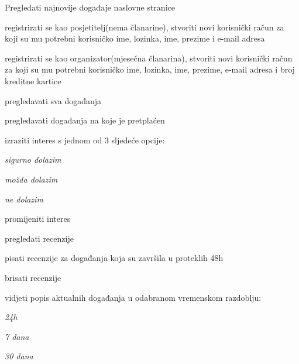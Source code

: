 		
		\begin{packed_enum}
			\item  {}
			
			\begin{packed_enum}
				
				\item Pregledati najnovije događaje naslovne stranice
				\item registrirati se kao posjetitelj(nema članarine),
				stvoriti novi korisnički račun za koji su mu potrebni korisničko ime, lozinka, ime, prezime i e-mail adresa
				\item registrirati se kao organizator(mjesečna članarina), stvoriti novi korisnički račun za koji su mu potrebni korisničko ime, lozinka, ime, prezime, e-mail adresa
				i broj kreditne kartice
				
				
			\end{packed_enum}
			
			\item  {}
			
			\begin{packed_enum}
				
				\item pregledavati sva događanja
				\item pregledavati događanja na koje je pretplaćen
				\item izraziti interes s jednom od 3 sljedeće opcije:
				
				\begin{packed_enum}
					\item \textit{sigurno dolazim}
					\item \textit{možda dolazim}
					\item \textit{ne dolazim}
				\end{packed_enum}	
				
				
				\item promijeniti interes 
				\item pregledati recenzije
				\item pisati recenzije za događanja koja su završila u proteklih 48h
				\item brisati recenzije
				\item vidjeti popis aktualnih događanja u odabranom vremenskom razdoblju:
				\begin{packed_enum}
					\item \textit{24h}
					\item \textit{7 dana}
					\item \textit{30 dana}
				\end{packed_enum}
				

\end{packed_enum}
\end{packed_enum}
